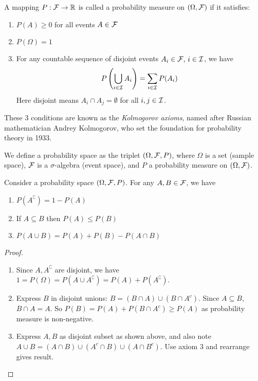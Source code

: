 \documentclass[11pt]{article}
\begin{document}
\begin{definition}
  A mapping \(P:\cal{F}\to\R\) is called a probability measure on \((\Omega,\cal{F})\) if it satisfies:
  \begin{enumerate}
    \item \(P(A)\geq 0\) for all events \(A\in\cal{F}\)
    \item \(P(\Omega)=1\)
    \item For any countable sequence of disjoint events \(A_i\in\cal{F},\,i\in\cal{I}\), we have \[P\left(\bigcup_{i\in\cal{I}}A_i\right)=\sum_{i\in\cal{I}}P(A_i)\]
    Here disjoint means \(A_i\cap A_j =\emptyset\) for all \(i,j\in\cal{I}\).
  \end{enumerate}  
\end{definition}
These 3 conditions are known as the \emph{Kolmogorov axioms}, named after Russian mathematician Andrey Kolmogorov, who set the foundation for probability theory in 1933.

\begin{definition}
  We define a probability space as the triplet \((\Omega,\cal{F},P)\), where \(\Omega\) is a set (sample space), \(\cal{F}\) is a \(\sigma\)-algebra (event space), and \(P\) a probability measure on \((\Omega,\cal{F})\).
\end{definition}

\begin{proposition}
  Consider a probability space \((\Omega,\cal{F},P)\). For any \(A,B\in\cal{F}\), we have
  \begin{enumerate}
    \item \(P(A^\complement)=1-P(A)\)
    \item If \(A\subseteq B\) then \(P(A)\leq P(B)\)
    \item \(P(A\cup B)=P(A)+P(B)-P(A\cap B)\)
  \end{enumerate}
\end{proposition}

\begin{proof}
  \begin{enumerate}
    \item Since \(A,A^\complement\) are disjoint, we have \(1=P(\Omega)=P(A\cup A^\complement)=P(A)+P(A^\complement)\).
    \item Express \(B\) in disjoint unions: \(B=(B\cap A)\cup(B\cap A^c)\). Since \(A\subseteq B\), \(B\cap A =A\). So \(P(B)= P(A)+P(B\cap A^c)\geq P(A)\) as probability measure is non-negative.
    \item Express \(A,B\) as disjoint subset as shown above, and also note \(A\cup B= (A\cap B)\cup(A^c\cap B)\cup(A\cap B^c)\). Use axiom 3 and rearrange gives result.
  \end{enumerate}

\end{proof}
\end{document}
